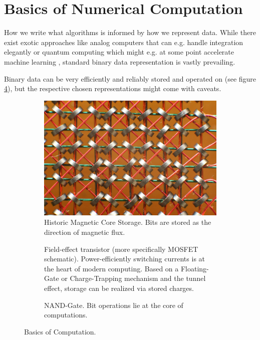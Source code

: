 \part{Basics of Numerical Computation}
\thispagestyle{plain}

How we write what algorithms is informed by how we represent data. While
there exist exotic approaches like analog computers that can e.g. handle
integration elegantly \citep{Ulmann2020} or quantum computing which
might e.g. at some point accelerate machine learning \citep{biamonte2017quantum},
standard binary data representation is vastly prevailing.

Binary data can be very efficiently and reliably stored and operated on (see figure \ref{fig:basics_computation}),
but the respective chosen representations might come with caveats.

\begin{figure}

    \centering

    \begin{subfigure}{0.4\textwidth}
      \centering
      \includegraphics[width=.95\linewidth]{figures/magnetic_memory.jpg}
      \caption{Historic Magnetic Core Storage. Bits are stored as the direction of magnetic flux.}
      \label{fig:mcore}
    \end{subfigure}\hspace{0.1\textwidth}%
    \begin{subfigure}{0.4\textwidth}
      \centering
      
      \caption{Field-effect transistor (more specifically MOSFET schematic). Power-efficiently switching currents is at the heart of modern computing. Based on a Floating-Gate or Charge-Trapping mechanism and the tunnel effect, storage can be realized via stored charges.}
      \label{fig:fet}
    \end{subfigure}

    \begin{subfigure}{0.5\textwidth}
        \centering
        
        \caption{NAND-Gate. Bit operations lie at the core of computations.}
        \label{fig:nand}
    \end{subfigure}

    \caption{Basics of Computation.}
    \label{fig:basics_computation}

\end{figure}